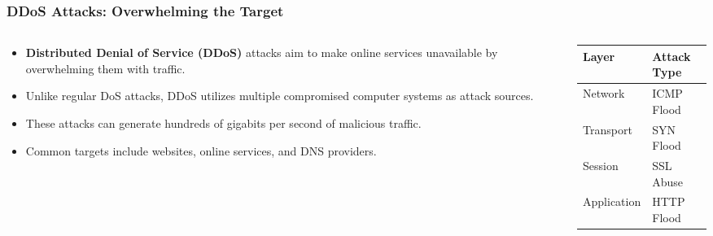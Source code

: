 \documentclass{beamer}
\begin{document}
\begin{frame}
    \frametitle{DDoS Attacks: Overwhelming the Target}
    
    \begin{columns}
        \begin{column}{0.55\textwidth}
            \begin{itemize}
                \item \textbf{Distributed Denial of Service (DDoS)} attacks aim to make online services unavailable by overwhelming them with traffic.
                \item Unlike regular DoS attacks, DDoS utilizes multiple compromised computer systems as attack sources.
                \item These attacks can generate hundreds of gigabits per second of malicious traffic.
                \item Common targets include websites, online services, and DNS providers.
            \end{itemize}
        \end{column}
        \begin{column}{0.45\textwidth}
            \begin{table}
                \centering
                \small
                \begin{tabular}{l|l}
                    \textbf{Layer} & \textbf{Attack Type} \\
                    \hline
                    Network & ICMP Flood \\
                    Transport & SYN Flood \\
                    Session & SSL Abuse \\
                    Application & HTTP Flood \\
                \end{tabular}
            \end{table}
        \end{column}
    \end{columns}
    
\end{frame}
\end{document}
